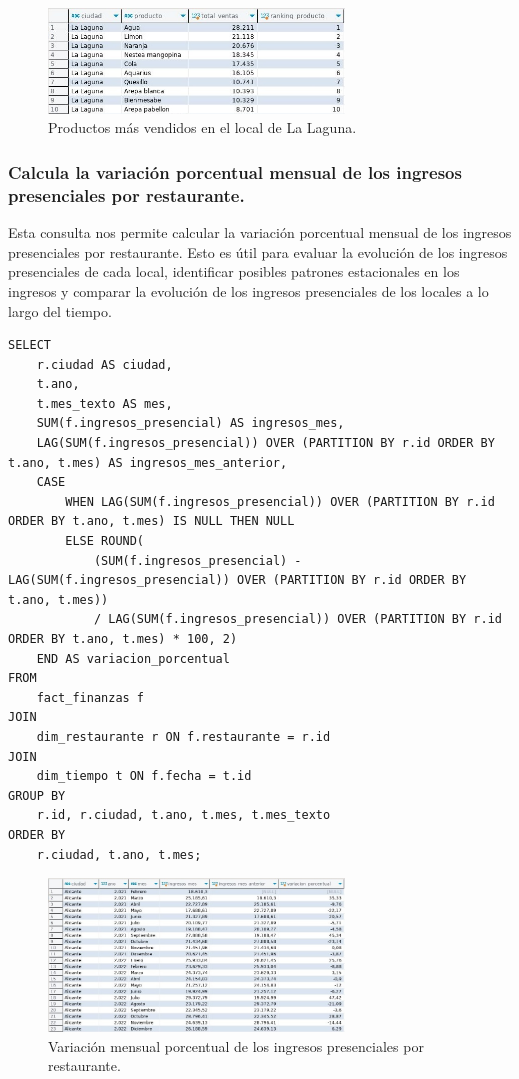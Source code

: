 \documentclass[11pt]{opticajnl}
\begin{document}
\begin{figure}[H]
    \centering
    \includegraphics[width=0.7\textwidth]{fotos/q2.jpg}
    \caption{Productos más vendidos en el local de La Laguna.}
    \label{fig:rolap1}
\end{figure}


\subsubsection{Calcula la variación porcentual mensual de los ingresos presenciales por restaurante.}

Esta consulta nos permite calcular la variación porcentual mensual de los ingresos presenciales por restaurante. Esto es útil para evaluar la evolución de los ingresos presenciales de cada local, identificar posibles patrones estacionales en los ingresos y comparar la evolución de los ingresos presenciales de los locales a lo largo del tiempo.


\begin{lstlisting}[style=sql]
SELECT 
    r.ciudad AS ciudad,
    t.ano,
    t.mes_texto AS mes,
    SUM(f.ingresos_presencial) AS ingresos_mes,
    LAG(SUM(f.ingresos_presencial)) OVER (PARTITION BY r.id ORDER BY t.ano, t.mes) AS ingresos_mes_anterior,
    CASE 
        WHEN LAG(SUM(f.ingresos_presencial)) OVER (PARTITION BY r.id ORDER BY t.ano, t.mes) IS NULL THEN NULL
        ELSE ROUND(
            (SUM(f.ingresos_presencial) - LAG(SUM(f.ingresos_presencial)) OVER (PARTITION BY r.id ORDER BY t.ano, t.mes)) 
            / LAG(SUM(f.ingresos_presencial)) OVER (PARTITION BY r.id ORDER BY t.ano, t.mes) * 100, 2)
    END AS variacion_porcentual
FROM 
    fact_finanzas f
JOIN 
    dim_restaurante r ON f.restaurante = r.id
JOIN 
    dim_tiempo t ON f.fecha = t.id
GROUP BY 
    r.id, r.ciudad, t.ano, t.mes, t.mes_texto
ORDER BY 
    r.ciudad, t.ano, t.mes;
\end{lstlisting}

\begin{figure}[H]
    \centering
    \includegraphics[width=0.7\textwidth]{fotos/q3.jpg}
    \caption{Variación mensual porcentual de los ingresos presenciales por restaurante.}
    \label{fig:rolap2}
\end{figure}
\end{document}
